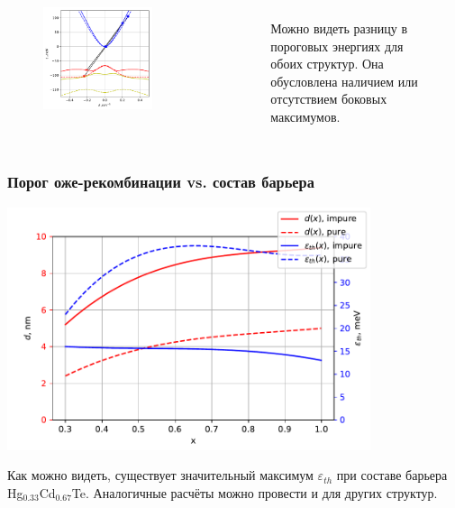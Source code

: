 \documentclass[9pt,pdf]{beamer}
\begin{document}
\begin{frame}
\begin{columns}
        \begin{figure}[t]
        \begin{center}
          \includegraphics[width=0.8\textwidth]{./images/18um_p_vs_i.pdf}
        \end{center}
        \end{figure}

        \begin{figure}[b]
        Можно видеть разницу в пороговых энергиях для обоих структур.
          Она обусловлена наличием или отсутствием боковых максимумов.
          \vspace{0.223cm}
        \end{figure}
      \end{columns}
  \end{frame}

  \begin{frame}
    \frametitle{Порог оже-рекомбинации vs. состав барьера}

    \begin{center}
      \includegraphics[width=0.8\textwidth]{./images/de_vs_x.pdf}
    \end{center}

    Как можно видеть, существует значительный максимум $\varepsilon_{th}$ при составе барьера
    Hg${}_{0.33}$Cd${}_{0.67}$Te. Аналогичные расчёты можно провести и для других структур.

  \end{frame}
\end{document}
